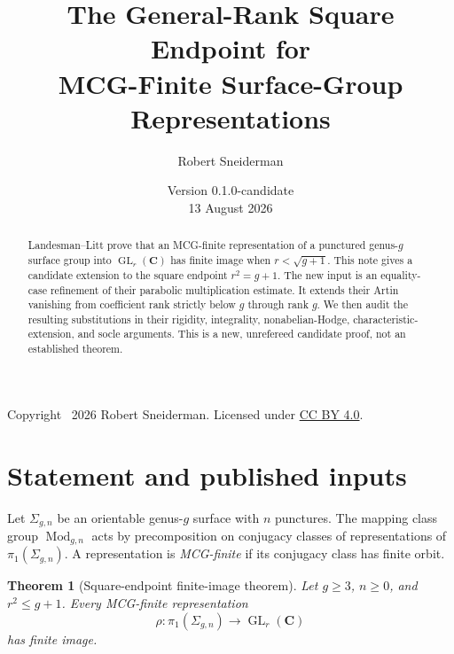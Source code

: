 \documentclass[11pt]{article}
\title{The General-Rank Square Endpoint for\\
MCG-Finite Surface-Group Representations}
\author{Robert Sneiderman}
\date{Version 0.1.0-candidate\\13 August 2026}
\newtheorem{theorem}{Theorem}[section]
\theoremstyle{definition}
\newcommand{\C}{\mathbf C}
\newcommand{\Mod}{\operatorname{Mod}}
\newcommand{\GL}{\operatorname{GL}}
\begin{document}
\maketitle

\begin{abstract}
Landesman--Litt prove that an MCG-finite representation of a punctured
genus-$g$ surface group into $\GL_r(\C)$ has finite image when
$r<\sqrt{g+1}$.  This note gives a candidate extension to the square
endpoint $r^2=g+1$.  The new input is an equality-case refinement of their
parabolic multiplication estimate.  It extends their Artin vanishing from
coefficient rank strictly below $g$ through rank $g$.  We then audit the
resulting substitutions in their rigidity, integrality, nonabelian-Hodge,
characteristic-extension, and socle arguments.  This is a new, unrefereed
candidate proof, not an established theorem.
\end{abstract}

\begin{center}
\end{center}

\begin{center}
\small Copyright \textcopyright\ 2026 Robert Sneiderman.  Licensed under
\href{https://creativecommons.org/licenses/by/4.0/}{CC BY 4.0}.
\end{center}

\tableofcontents

\section{Statement and published inputs}\label{sec:inputs}

Let $\Sigma_{g,n}$ be an orientable genus-$g$ surface with $n$ punctures.
The mapping class group $\Mod_{g,n}$ acts by precomposition on conjugacy
classes of representations of $\pi_1(\Sigma_{g,n})$.  A representation is
\emph{MCG-finite} if its conjugacy class has finite orbit.

\begin{theorem}[Square-endpoint finite-image theorem]
\label{thm:square-endpoint}
Let $g\ge3$, $n\ge0$, and $r^2\le g+1$.  Every MCG-finite representation
\[
 \rho:\pi_1(\Sigma_{g,n})\longrightarrow\GL_r(\C)
\]
has finite image.
\end{theorem}
\end{document}
